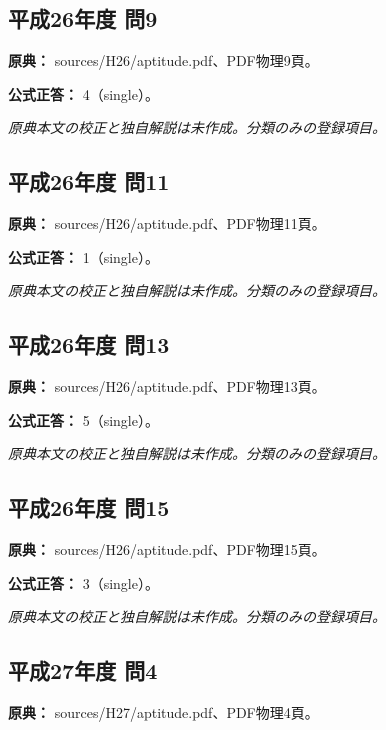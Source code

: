 \subsection{平成26年度 問9}
\label{q:h26-reg-apt-09}

\noindent\textbf{原典：} sources/H26/aptitude.pdf、PDF物理9頁。

\textbf{公式正答：} 4（single）。

\par\textit{原典本文の校正と独自解説は未作成。分類のみの登録項目。}

\subsection{平成26年度 問11}
\label{q:h26-reg-apt-11}

\noindent\textbf{原典：} sources/H26/aptitude.pdf、PDF物理11頁。

\textbf{公式正答：} 1（single）。

\par\textit{原典本文の校正と独自解説は未作成。分類のみの登録項目。}

\subsection{平成26年度 問13}
\label{q:h26-reg-apt-13}

\noindent\textbf{原典：} sources/H26/aptitude.pdf、PDF物理13頁。

\textbf{公式正答：} 5（single）。

\par\textit{原典本文の校正と独自解説は未作成。分類のみの登録項目。}

\subsection{平成26年度 問15}
\label{q:h26-reg-apt-15}

\noindent\textbf{原典：} sources/H26/aptitude.pdf、PDF物理15頁。

\textbf{公式正答：} 3（single）。

\par\textit{原典本文の校正と独自解説は未作成。分類のみの登録項目。}

\subsection{平成27年度 問4}
\label{q:h27-reg-apt-04}

\noindent\textbf{原典：} sources/H27/aptitude.pdf、PDF物理4頁。

